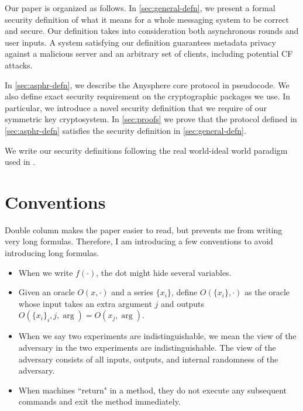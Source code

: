 
Our paper is organized as follows. In \cref{sec:general-defn}, we present a formal security definition of what it means for a whole messaging system to be correct and secure. Our definition takes into consideration both asynchronous rounds and user inputs. A system satisfying our definition guarantees metadata privacy against a malicious server and an arbitrary set of clients, including potential CF attacks.

In \cref{sec:asphr-defn}, we describe the Anysphere core protocol in pseudocode. We also define exact security requirement on the cryptographic packages we use. In particular, we introduce a novel security definition that we require of our symmetric key cryptosystem. In \cref{sec:proofs} we prove that the protocol defined in \cref{sec:asphr-defn} satisfies the security definition in \cref{sec:general-defn}.

We write our security definitions following the real world-ideal world paradigm used in \cite{shi2021non}.



\section{Conventions}
Double column makes the paper easier to read, but prevents me from writing very long formulas. Therefore, I am introducing a few conventions to avoid introducing long formulas.
\begin{itemize}
    \item When we write $f(\cdot)$, the dot might hide several variables.
    
    \item Given an oracle $O(x, \cdot)$ and a series $\{x_i\}$, define $O(\{x_i\}, \cdot)$ as the oracle whose input takes an extra argument $j$ and outputs $O(\{x_i\}_i, j, \arg) = O(x_j, \arg)$.

    \item When we say two experiments are indistinguishable, we mean the view of the adversary in the two experiments are indistinguishable. The view of the adversary consists of all inputs, outputs, and internal randomness of the adversary.
    
    \item When machines ``return" in a method, they do not execute any subsequent commands and exit the method immediately.
\end{itemize}
